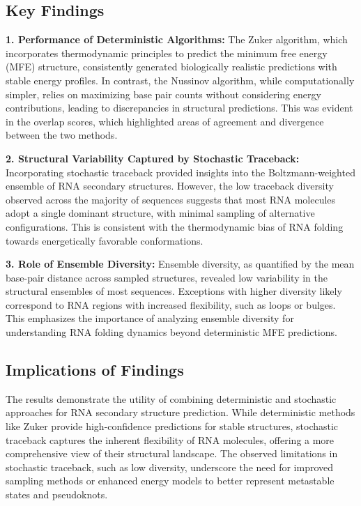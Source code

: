 \documentclass[10pt]{wlscirep}
\begin{document}
\subsection{Key Findings}

\textbf{1. Performance of Deterministic Algorithms:}  
The Zuker algorithm, which incorporates thermodynamic principles to predict the minimum free energy (MFE) structure, consistently generated biologically realistic predictions with stable energy profiles. In contrast, the Nussinov algorithm, while computationally simpler, relies on maximizing base pair counts without considering energy contributions, leading to discrepancies in structural predictions. This was evident in the overlap scores, which highlighted areas of agreement and divergence between the two methods.

\textbf{2. Structural Variability Captured by Stochastic Traceback:}  
Incorporating stochastic traceback provided insights into the Boltzmann-weighted ensemble of RNA secondary structures. However, the low traceback diversity observed across the majority of sequences suggests that most RNA molecules adopt a single dominant structure, with minimal sampling of alternative configurations. This is consistent with the thermodynamic bias of RNA folding towards energetically favorable conformations.

\textbf{3. Role of Ensemble Diversity:}  
Ensemble diversity, as quantified by the mean base-pair distance across sampled structures, revealed low variability in the structural ensembles of most sequences. Exceptions with higher diversity likely correspond to RNA regions with increased flexibility, such as loops or bulges. This emphasizes the importance of analyzing ensemble diversity for understanding RNA folding dynamics beyond deterministic MFE predictions.

\subsection{Implications of Findings}

The results demonstrate the utility of combining deterministic and stochastic approaches for RNA secondary structure prediction. While deterministic methods like Zuker provide high-confidence predictions for stable structures, stochastic traceback captures the inherent flexibility of RNA molecules, offering a more comprehensive view of their structural landscape. The observed limitations in stochastic traceback, such as low diversity, underscore the need for improved sampling methods or enhanced energy models to better represent metastable states and pseudoknots.
\end{document}
